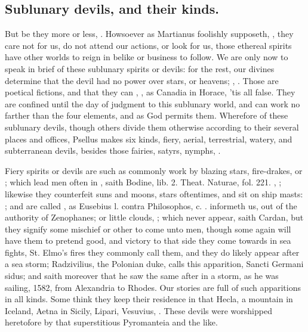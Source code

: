 {{\subsection{Sublunary devils, and their kinds.}
But be they more or less, . Howsoever as Martianus foolishly supposeth, , they care not for us, do not attend
our actions, or look for us, those ethereal spirits have other worlds
to reign in belike or business to follow. We are only now to speak in
brief of these sublunary spirits or devils: for the rest, our divines
determine that the devil had no power over stars, or heavens;
, \etc{}. Those are poetical
fictions, and that they can , \etc{}, as Canadia in Horace, 'tis all false. They are confined
until the day of judgment to this sublunary world, and can work no
farther than the four elements, and as God permits them. Wherefore of
these sublunary devils, though others divide them otherwise according
to their several places and offices, Psellus makes six kinds, fiery,
aerial, terrestrial, watery, and subterranean devils, besides those
fairies, satyrs, nymphs, \etc{}.

Fiery spirits or devils are such as commonly work by blazing stars,
fire-drakes, or ; which lead men often in , saith Bodine, lib. 2. Theat. Naturae, fol. 221. , \etc{}; likewise they
counterfeit suns and moons, stars oftentimes, and sit on ship masts: ; and are called , as Eusebius
l. contra Philosophos, c. . informeth us, out of the authority of
Zenophanes; or little clouds, ; which
never appear, saith Cardan, but they signify some mischief or other to
come unto men, though some again will have them to pretend good, and
victory to that side they come towards in sea fights, St. Elmo's fires
they commonly call them, and they do likely appear after a sea storm;
Radzivilius, the Polonian duke, calls this apparition, Sancti Germani
sidus; and saith moreover that he saw the same after in a storm, as he
was sailing, 1582, from Alexandria to Rhodes. Our stories are
full of such apparitions in all kinds. Some think they keep their
residence in that Hecla, a mountain in Iceland, Aetna in Sicily,
Lipari, Vesuvius, \etc{}. These devils were worshipped heretofore by that
superstitious Pyromanteia and the like.

}}
